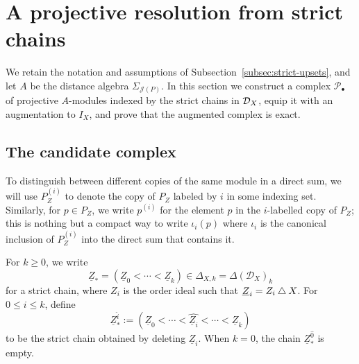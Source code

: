 \documentclass[a4paper,leqno]{amsart}
\begin{document}

\section{A projective resolution from strict chains}
\label{sec:candidate-resolution}

We retain the notation and assumptions of Subsection~\ref{subsec:strict-upsets}, and let $A$ be the distance algebra $\Sigma_{\mathcal{J}(P)}$.
In this section we construct a complex $\mathcal P_\bullet$ of projective $A$-modules indexed by the strict chains in $\mathcal D_X$, equip it with an augmentation to $I_X$, and prove that the augmented complex is exact.

\subsection{The candidate complex}

To distinguish between different copies of the same module in a direct sum, we will use $P_Z^{(i)}$ to denote the copy of $P_Z$ labeled by $i$ in some indexing set.  Similarly, for $p\in P_Z$, we write $p^{(i)}$ for the element $p$ in the $i$-labelled copy of $P_Z$; this is nothing but a compact way to write $\iota_i(p)$ where $\iota_i$ is the canonical inclusion of $P_Z^{(i)}$ into the direct sum that contains it.

For $k\geq0$, we write
\[
 \underline{Z}_\ast=(\underline{Z}_0<\cdots<\underline{Z}_k)
 \in\Delta_{X,k}=\Delta(\mathcal D_X)_k
\]
for a strict chain, where $Z_i$ is the order ideal such that $\underline{Z}_i = Z_i \mathbin{\triangle} X$. For $0\leq i\leq k$, define
\[
 \underline{Z}_\ast^{\widehat{i}}
 :=(\underline{Z}_0<\cdots<\widehat{\underline{Z}_i}<\cdots<\underline{Z}_k)
\]
to be the strict chain obtained by deleting $\underline{Z}_i$. When $k=0$, the chain $\underline{Z}_\ast^{\widehat{0}}$ is empty.
\end{document}

